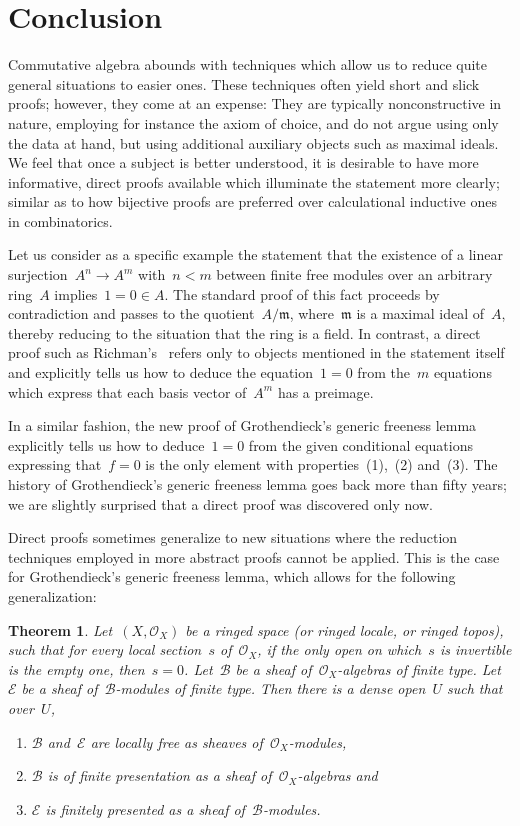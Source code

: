 \documentclass[oneside]{amsart}
\theoremstyle{definition}
\theoremstyle{plain}
\newtheorem{thm}[defn]{Theorem}
\theoremstyle{remark}
\newcommand{\mmm}{\mathfrak{m}}
\newcommand{\E}{\mathcal{E}}
\newcommand{\B}{\mathcal{B}}
\renewcommand{\O}{\mathcal{O}}
\begin{document}
\section{Conclusion}

Commutative algebra abounds with techniques which allow us to reduce quite
general situations to easier ones. These techniques often yield short and slick
proofs; however, they come at an expense: They are typically nonconstructive in
nature, employing for instance the axiom of choice, and do not argue using only
the data at hand, but using additional auxiliary objects such as maximal
ideals. We feel that once a subject is better understood, it is desirable to
have more informative, direct proofs available which illuminate the
statement more clearly; similar as to how bijective proofs are preferred over
calculational inductive ones in combinatorics.

Let us consider as a specific example the statement that the existence of a linear
surjection~$A^n \to A^m$ with~$n < m$ between finite free modules over an
arbitrary ring~$A$ implies~$1 = 0 \in A$. The standard proof of this fact proceeds
by contradiction and passes to the quotient~$A/\mmm$, where~$\mmm$ is a maximal
ideal of~$A$, thereby reducing to the situation that the ring is a field. In
contrast, a direct proof such as Richman's~\cite{richman:trivial-rings}
refers only to objects mentioned in the statement itself and
explicitly tells us how to deduce the equation~$1 = 0$ from the~$m$ equations
which express that each basis vector of~$A^m$ has a preimage.

In a similar fashion, the new proof of Grothendieck's generic freeness lemma
explicitly tells us how to deduce~$1 = 0$ from the given conditional
equations expressing that~$f = 0$ is the only element with properties~(1),~(2)
and~(3). The history of Grothendieck's generic freeness lemma goes back more
than fifty years; we are slightly surprised that a direct proof was
discovered only now.

Direct proofs sometimes generalize to new situations where the reduction techniques
employed in more abstract proofs cannot be applied. This is the case for
Grothendieck's generic freeness lemma, which allows for the following
generalization:

\begin{thm}\label{thm:general-generic-freeness}
Let~$(X,\O_X)$ be a ringed space (or ringed locale, or ringed topos), such
that for every local section~$s$ of~$\O_X$, if the only open on which~$s$ is
invertible is the empty one, then~$s = 0$. Let~$\B$ be a sheaf
of~$\O_X$-algebras of finite type. Let~$\E$ be a sheaf of~$\B$-modules of finite type. Then there is a dense
open~$U$ such that over~$U$,
\begin{enumerate}
\item[(a)] $\B$ and~$\E$ are locally free as sheaves of~$\O_X$-modules,
\item[(b)] $\B$ is of finite presentation as a sheaf of~$\O_X$-algebras and
\item[(c)] $\E$ is finitely presented as a sheaf of~$\B$-modules.
\end{enumerate}
\end{thm}
\end{document}
